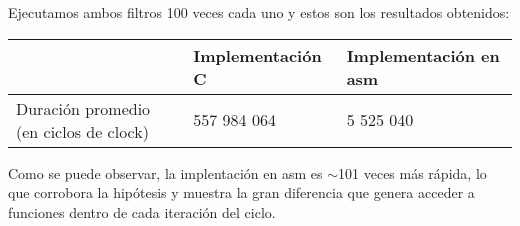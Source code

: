 Ejecutamos ambos filtros 100 veces cada uno y estos son los resultados obtenidos:

\begin{center}
    \begin{tabular}{|l|l|l|}
        \hline
         & Implementación C & Implementación en asm  \\
        \hline
        Duración promedio (en ciclos de clock) & 557 984 064        & 5 525 040 \\
        \hline
    \end{tabular}
\end{center}

Como se puede observar, la implentación en asm es $\sim$101 veces más rápida, lo que corrobora la hipótesis y muestra la gran diferencia que genera acceder a funciones dentro de cada iteración del ciclo.